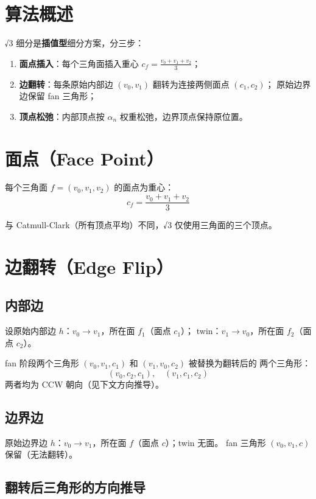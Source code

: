 \documentclass[11pt,a4paper]{article}
\begin{document}
\section{算法概述}

√3 细分是\textbf{插值型}细分方案，分三步：

\begin{enumerate}
  \item \textbf{面点插入}：每个三角面插入重心 $c_f = \frac{v_0+v_1+v_2}{3}$；
  \item \textbf{边翻转}：每条原始内部边 $(v_0, v_1)$ 翻转为连接两侧面点 $(c_1, c_2)$；
        原始边界边保留 fan 三角形；
  \item \textbf{顶点松弛}：内部顶点按 $\alpha_n$ 权重松弛，边界顶点保持原位置。
\end{enumerate}

\section{面点（Face Point）}

每个三角面 $f = (v_0, v_1, v_2)$ 的面点为重心：
$$
  c_f = \frac{v_0 + v_1 + v_2}{3}
$$

与 Catmull-Clark（所有顶点平均）不同，√3 仅使用三角面的三个顶点。

\section{边翻转（Edge Flip）}

\subsection{内部边}

设原始内部边 $h$：$v_0 \to v_1$，所在面 $f_1$（面点 $c_1$）；
twin：$v_1 \to v_0$，所在面 $f_2$（面点 $c_2$）。

fan 阶段两个三角形 $(v_0, v_1, c_1)$ 和 $(v_1, v_0, c_2)$ 被替换为翻转后的
两个三角形：
$$
  (v_0, c_2, c_1), \quad (v_1, c_1, c_2)
$$
两者均为 CCW 朝向（见下文方向推导）。

\subsection{边界边}

原始边界边 $h$：$v_0 \to v_1$，所在面 $f$（面点 $c$）；twin 无面。
fan 三角形 $(v_0, v_1, c)$ 保留（无法翻转）。

\subsection{翻转后三角形的方向推导}
\end{document}
